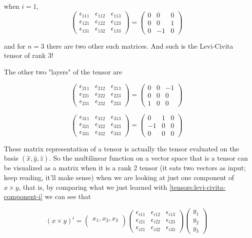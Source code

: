when $i=1$,
$$
\begin{pmatrix}
\epsilon_{111} & \epsilon_{112} & \epsilon_{113} \\
\epsilon_{121} & \epsilon_{122} & \epsilon_{123} \\
\epsilon_{131} & \epsilon_{132} & \epsilon_{133}
\end{pmatrix}
=
\begin{pmatrix}
0 & 0 & 0 \\
0 & 0 & 1 \\
0 & -1 & 0
\end{pmatrix}
$$

and for $n=3$ there are two other such matrices.
And such is the Levi-Civita tensor of rank 3!

The other two "layers" of the tensor are

$$
\begin{pmatrix}
\epsilon_{211} & \epsilon_{212} & \epsilon_{213} \\
\epsilon_{221} & \epsilon_{222} & \epsilon_{223} \\
\epsilon_{231} & \epsilon_{232} & \epsilon_{233}
\end{pmatrix}
=
\begin{pmatrix}
0 & 0 & -1 \\
0 & 0 & 0 \\
1 & 0 & 0
\end{pmatrix}
$$

$$
\begin{pmatrix}
\epsilon_{311} & \epsilon_{312} & \epsilon_{313} \\
\epsilon_{321} & \epsilon_{322} & \epsilon_{323} \\
\epsilon_{331} & \epsilon_{332} & \epsilon_{333}
\end{pmatrix}
=
\begin{pmatrix}
0 & 1 & 0 \\
-1 & 0 & 0 \\
0 & 0 & 0
\end{pmatrix}
$$

These matrix representation of a tensor is actually the tensor evaluated on the basis $(\hat{x}, \hat{y}, \hat{z})$.
So the multilinear function on a vector space that is a tensor can be visualized as a matrix when it is a rank 2 tensor
(it eats two vectors as input; keep reading, it'll make sense) when we are looking at just one component of
$x \times y$, that is, by comparing what we just learned with \ref{tensors:levi-civita-component-i} we can see that

$$
\left( x \times y \right)^i =
\begin{pmatrix}
    x_1, x_2, x_3 \\
\end{pmatrix}
\begin{pmatrix}
    \epsilon_{i11} & \epsilon_{i12} & \epsilon_{i13} \\
    \epsilon_{i21} & \epsilon_{i22} & \epsilon_{i23} \\
    \epsilon_{i31} & \epsilon_{i32} & \epsilon_{i33}
\end{pmatrix}
\begin{pmatrix}
    y_1 \\
    y_2 \\
    y_3
\end{pmatrix}
$$
